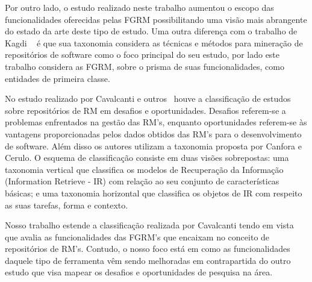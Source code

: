 Por outro lado, o estudo realizado neste trabalho aumentou o escopo das
funcionalidades oferecidas pelas FGRM possibilitando uma visão mais abrangente
do estado da arte deste tipo de estudo. Uma outra diferença com o trabalho de
Kagdi ~\cite{kagdi2012assigning} é que sua taxonomia considera as técnicas e
métodos para mineração de repositórios de software como o foco principal do seu
estudo, por lado este trabalho considera as FGRM, sobre o prisma de suas
funcionalidades, como entidades de primeira classe.

No estudo realizado por Cavalcanti e outros~\cite{cavalcanti2014challenges}
houve a classificação de estudos sobre repositórios de RM em desafios e
oportunidades.  Desafios referem-se a problemas enfrentados na gestão das RM's,
enquanto oportunidades referem-se às vantagens proporcionadas pelos dados
obtidos das  RM's para o desenvolvimento de software. Além disso os autores
utilizam a taxonomia proposta por Canfora e Cerulo\cite{cerulo2004taxonomy}. O
esquema de classificação consiste em duas visões sobrepostas: uma taxonomia
vertical que classifica os modelos de Recuperação da Informação (Information
Retrieve - IR) com relação ao seu conjunto de características básicas; e uma
taxonomia horizontal que classifica os objetos de IR com respeito as suas
tarefas, forma e contexto.

Nosso trabalho estende a classificação realizada por Cavalcanti tendo em vista
que avalia as funcionalidades das FGRM's  que encaixam no conceito de
repositórios de RM's. Contudo, o nosso foco está em como as funcionalidades
daquele tipo de ferramenta vêm sendo melhoradas em contrapartida do outro estudo
que visa mapear os desafios e oportunidades de pesquisa na área.

